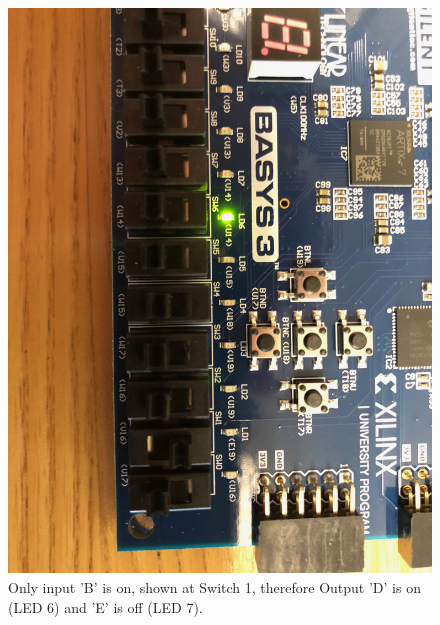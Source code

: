 \documentclass[11pt]{article}
\begin{document}
\begin{figure}[H]
	\includegraphics[width=\textwidth]{report_images/Lab1BoardPictures/Lab1Part1/IMG_0405.jpg}
	\caption{\label{fig:figure-name}Only input 'B' is on, shown at Switch 1, therefore Output 'D' is on (LED 6) and 'E' is off (LED 7).}
\end{figure}
\end{document}
